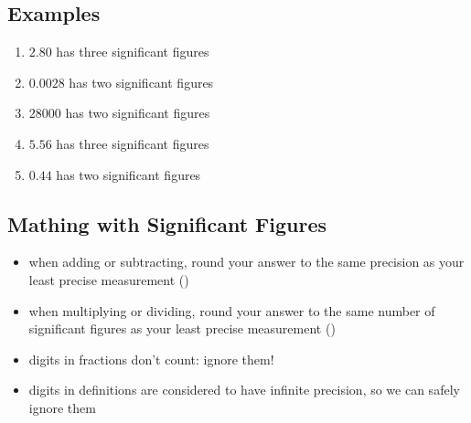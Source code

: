 \documentclass[11pt, oneside]{article}   	%
\begin{document}
\subsection{Examples}
\begin{enumerate}[label=Example \arabic*]
\item $2.80$ has three significant figures
\item $0.0028$ has two significant figures
\item $28000$ has two significant figures
\item $5.56$ has three significant figures
\item $0.44$ has two significant figures
\end{enumerate}


\subsection{Mathing with Significant Figures}
\begin{itemize}
\item when adding or subtracting, round your answer to the same precision as your least precise measurement (\cite[p. 25]{wile-chem-2})
\item when multiplying or dividing, round your answer to the same number of significant figures as your least precise measurement (\cite[p. 26]{wile-chem-2})
\item digits in fractions don't count: ignore them!
\item digits in definitions are considered to have infinite precision, so we can safely ignore them
\end{itemize}
\end{document}
